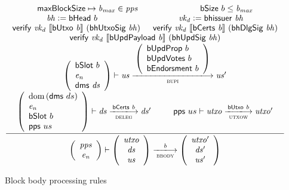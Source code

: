 \documentclass[11pt,a4paper]{article}
\DeclareMathOperator{\dom}{dom}
\newcommand{\var}[1]{\mathit{#1}}
\newcommand{\fun}[1]{\mathsf{#1}}
\newcommand{\trans}[2]{\xlongrightarrow[\textsc{#1}]{#2}}
\newcommand{\serialised}[1]{\llbracket \var{#1} \rrbracket}
\newcommand{\leteq}{\ensuremath{\mathrel{\mathop:}=}}
\newcommand{\bsizename}{bSize}
\newcommand{\verifyname}{verify}
\newcommand{\bcertsname}{bCerts}
\newcommand{\bhissuername}{bhissuer}
\newcommand{\verify}[3]{\fun{\verifyname} ~ #1 ~ #2 ~ #3}
\newcommand{\bsize}[1]{\fun{\bsizename} ~ #1}
\newcommand{\bcerts}[1]{\fun{\bcertsname} ~ #1}
\newcommand{\bhissuer}[1]{\fun{\bhissuername} ~ #1}
\begin{document}
\begin{figure}[ht]
  \begin{equation*}
    \inference
    { \maxblocksize \mapsto \var{b_{max}} \in \var{pps} && \bsize{b} \leq \var{b_{max}} \\
      \var{bh} \leteq \bhead{b} & \var{vk_d} \leteq \bhissuer{\var{bh}} \\
      \verify{\var{vk_d}}{\serialised{\butxo{b}}}{(\fun{bhUtxoSig}~\var{bh})} &
      \verify{\var{vk_d}}{\serialised{\bcerts{b}}}{(\fun{bhDlgSig}~\var{bh})} \\
      \verify{\var{vk_d}}{\serialised{\bupdpayload{b}}}{(\fun{bhUpdSig}~\var{bh})} \\
      {\left(
          \begin{array}{l}
            \bslot{b} \\
            \var{e_n} \\
            \fun{dms} ~ \var{ds}
          \end{array}
        \right)}
      \vdash \var{us} \trans{bupi}{
        {\left(
            \begin{array}{l}
              \bupdprop{b} \\
              \bupdvotes{b} \\
              \bendorsment{b}
            \end{array}
          \right)}
      } \var{us'}
      \\
      {\left(
          \begin{array}{l}
            \dom{(\fun{dms}~ ds)} \\
            \var{e_n} \\
            \bslot{b} \\
            \fun{pps} ~  us \\
          \end{array}
        \right)}
      \vdash \var{ds} \trans{deleg}{\bcerts{b}} \var{ds'} &
      \fun{pps} ~  us \vdash \var{utxo} \trans{utxow}{\butxo{b}} \var{utxo'} \\
    }
    {
      \left(
        {\begin{array}{c}
           \var{pps} \\
           \var{e_n}
         \end{array}}
     \right)
     \vdash
     {
       \left(
         {\begin{array}{c}
            \var{utxo} \\
            \var{ds} \\
            \var{us}
          \end{array}}
      \right)
    }
    \trans{bbody}{\var{b}}
    {
      \left(
        {\begin{array}{c}
           \var{utxo'} \\
           \var{ds'} \\
           \var{us'}
         \end{array}}
     \right)
   }
 }
\end{equation*}
\caption{Block body processing rules}
\label{fig:rules:bbody}
\end{figure}
\end{document}
